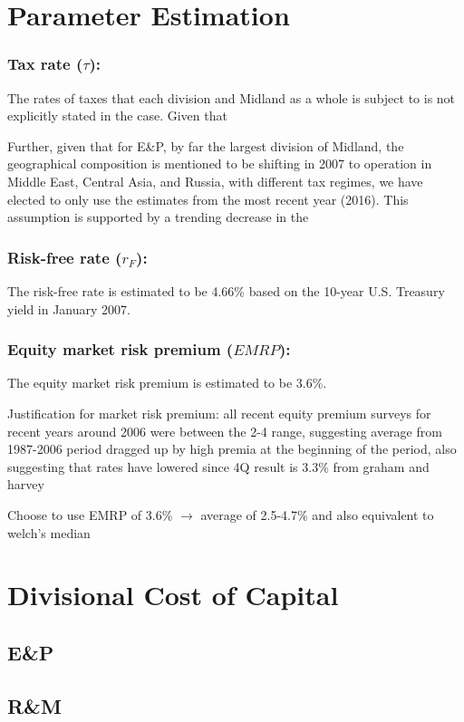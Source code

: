 \documentclass{article}
\begin{document}
\hrulefill
\section{Parameter Estimation}
\subsubsection*{Tax rate ($\tau$):}The rates of taxes that each division and Midland as a whole is subject to is not explicitly stated in the case. Given that 

Further, given that for E\&P, by far the largest division of Midland, the geographical composition is mentioned to be shifting in 2007 to operation in Middle East, Central Asia, and Russia, with different tax regimes, we have elected to only use the estimates from the most recent year (2016). This assumption is supported by a trending decrease in the

\subsubsection*{Risk-free rate ($r_F$):} The risk-free rate is estimated to be 4.66\% based on the 10-year U.S. Treasury yield in January 2007.

\subsubsection*{Equity market risk premium ($EMRP$):} The equity market risk premium is estimated to be 3.6\%.

Justification for market risk premium: all recent equity premium surveys for recent years around 2006  were between the 2-4 range, suggesting average from 1987-2006 period dragged up by high premia at the beginning of the period, also suggesting that rates have lowered since
4Q result is 3.3\% from graham and harvey

Choose to use EMRP of 3.6\% $\rightarrow$ average of 2.5-4.7\% and also equivalent to welch’s median


\hrulefill
\section{Divisional Cost of Capital}
\subsection{E\&P}
\subsection{R\&M}
\end{document}
